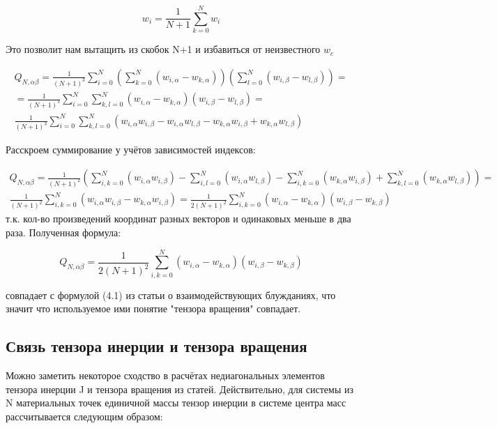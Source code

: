 \begin{equation}
    w_{i} = \frac{1}{N+1} \sum_{k=0}^{N} w_{i}
\end{equation}

Это позволит нам вытащить из скобок N+1 и избавиться от неизвестного $w_{c}$

\begin{align*}
    Q_{N,\alpha\beta} = \frac{1}{(N+1)^{3}} \sum^{N}_{i=0}(\sum^{N}_{k=0}(w_{i,\alpha} - w_{k, \alpha}))(\sum^{N}_{l=0}(w_{i,\beta} - w_{l, \beta})) = \\
    = \frac{1}{(N+1)^{3}} \sum^{N}_{i=0} \sum^{N}_{k,l=0}(w_{i,\alpha} - w_{k, \alpha})(w_{i,\beta} - w_{l, \beta}) = \\
    \frac{1}{(N+1)^{3}} \sum^{N}_{i=0} \sum^{N}_{k,l=0} (w_{i,\alpha} w_{i,\beta} - w_{i,\alpha} w_{l,\beta} - w_{k,\alpha} w_{i,\beta} + w_{k,\alpha} w_{l,\beta})
\end{align*}

Расскроем суммирование у учётов зависимостей индексов:

\begin{align*}
    Q_{N,\alpha\beta} = \frac{1}{(N+1)^{2}} (\sum^{N}_{i,k=0}(w_{i,\alpha} w_{i,\beta}) - \sum^{N}_{i,l=0}(w_{i,\alpha} w_{l,\beta}) - \sum^{N}_{i,k=0}(w_{k,\alpha} w_{i,\beta}) + \sum^{N}_{k,l=0}(w_{k,\alpha} w_{l,\beta})) = \\
    \frac{1}{(N+1)^{2}} \sum^{N}_{i,k=0}(w_{i,\alpha} w_{i,\beta} - w_{k,\alpha} w_{i,\beta}) = \frac{1}{2(N+1)^{2}} \sum^{N}_{i,k=0}(w_{i,\alpha} - w_{k, \alpha})(w_{i,\beta} - w_{k, \beta})
\end{align*}
т.к. кол-во произведений координат разных векторов и одинаковых меньше в два раза. Полученная формула:

\begin{equation}\label{eq:Ten_G2}
    Q_{N,\alpha\beta} = \frac{1}{2(N+1)^{2}} \sum^{N}_{i,k=0}(w_{i,\alpha} - w_{k, \alpha})(w_{i,\beta} - w_{k, \beta})
\end{equation}

совпадает с формулой (4.1) из статьи о взаимодействующих блужданиях\cite{caracciolo2011geometrical}, что значит что используемое ими понятие "тензора вращения" совпадает.

\subsection{Связь тензора инерции и тензора вращения}

Можно заметить некоторое сходство в расчётах недиагональных элементов тензора инерции J и тензора вращения из статей\cite{caracciolo2011geometrical,arkin2013gyration}. Действительно, для системы из N материальных точек единичной массы тензор инерции в системе центра масс рассчитывается следующим образом:

